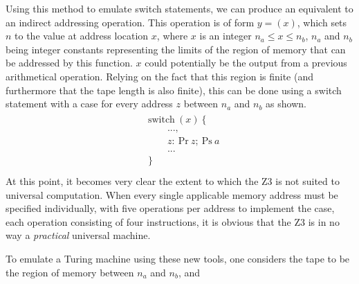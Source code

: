 \documentclass[Master.tex]{subfiles}
\begin{document}
Using this method to emulate switch statements, we can produce an equivalent to an indirect addressing operation. This operation is of form $y = (x)$, which sets $n$ to the value at address location $x$, where $x$ is an integer $n_a \leq x \leq n_b$, $n_a$ and $n_b$ being integer constants representing the limits of the region of memory that can be addressed by this function. $x$ could potentially be the output from a previous arithmetical operation. Relying on the fact that this region is finite (and furthermore that the tape length is also finite), this can be done using a switch statement with a case for every address $z$ between $n_a$ and $n_b$ as shown.
\begin{gather*}
\begin{aligned}
&\bm{\mathrm{switch}}\ (x)\ \{	\\
&\qquad ... ,					\\
&\qquad z:\	\mathrm{Pr}\ z;\ \mathrm{Ps}\ a			\\
&\qquad ... 					\\
&\}								\\
\end{aligned}
\end{gather*}
At this point, it becomes very clear the extent to which the Z3 is not suited to universal computation. When every single applicable memory address must be specified individually, with five operations per address to implement the case, each operation consisting of four instructions, it is obvious that the Z3 is in no way a \textit{practical} universal machine. 

To emulate a Turing machine using these new tools, one considers the tape to be the region of memory between $n_a$ and $n_b$, and 
\end{document}
